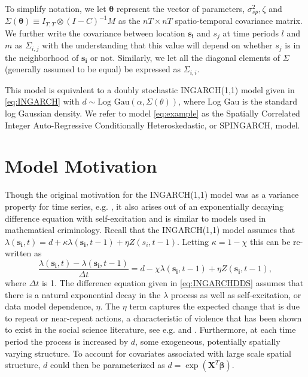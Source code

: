 \documentclass[11pt]{isuthesis}
\begin{document}
To simplify notation, we let $\boldsymbol{\theta}$ represent the vector of parameters, $\sigma_{sp}^2,\zeta$ and $\Sigma(\boldsymbol{\theta}) \equiv I_{T,T}\otimes(I-C)^{-1}M$ as the $nT \times nT$ spatio-temporal covariance matrix.  We further write the covariance between location $\boldsymbol{s_i}$ and $s_j$ at time periods $l$ and $m$ as $\Sigma_{i,j}$ with the understanding that this value will depend on whether $s_j$ is in the neighborhood of $\boldsymbol{s_i}$ or not.  Similarly, we let all the diagonal elements of $\Sigma$ (generally assumed to be equal) be expressed as $\Sigma_{i,i}$. 

This model is equivalent to a doubly stochastic INGARCH(1,1) model given in \eqref{eq:INGARCH} with $d\sim \mbox{Log Gau}(\alpha,\Sigma(\theta))$, where Log Gau is the standard log Gaussian density.  We refer to model \eqref{eq:example} as the Spatially Correlated Integer Auto-Regressive Conditionally Heteroskedastic, or SPINGARCH, model.  


\section{Model Motivation}

Though the original motivation for the INGARCH(1,1) model was as a variance property for time series, e.g. \cite{ferland2006integer}, it also arises out of an exponentially decaying difference equation with self-excitation and is similar to models used in mathematical criminology.  Recall that the INGARCH(1,1) model assumes that $\lambda(\boldsymbol{s_i},t)=d+\kappa \lambda(\boldsymbol{s_i},t-1)+\eta Z(s_i,t-1)$.  Letting $\kappa=1-\chi$ this can be re-written as
\begin{equation}
	\frac{\lambda(\boldsymbol{s_i},t)-\lambda(\boldsymbol{s_i},t-1)}{\Delta t}=d-\chi \lambda(\boldsymbol{s_i},t-1)+\eta Z(\boldsymbol{s_i},t-1), \label{eq:INGARCHDDS}
\end{equation}
where $\Delta t$ is 1.  The difference equation given in \eqref{eq:INGARCHDDS} assumes that there is a natural exponential decay in the $\lambda$ process as well as self-excitation, or data model dependence, $\eta$.  The $\eta$ term captures the expected change  that is due to repeat or near-repeat actions, a characteristic of violence that has been shown to exist in the social science literature, see e.g. \cite{polvi1990repeat} and \cite{pease1998repeat}.  Furthermore, at each time period the process is increased by $d$, some exogeneous, potentially spatially varying structure.  To account for covariates associated with large scale spatial structure, $d$ could then be parameterized as $d=\exp(\boldsymbol{X}^T \boldsymbol{\beta})$.
\end{document}
